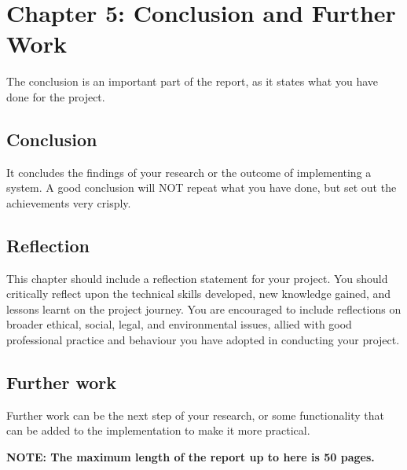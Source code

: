 \section*{Chapter 5: Conclusion and Further Work}
\setcounter{section}{5} \setcounter{subsection}{0}

The conclusion is an important part of the report, as it states what you have done for the project.

\subsection{Conclusion}
It concludes the findings of your research or the outcome of implementing a system. A good conclusion will NOT repeat what you have done, but set out the achievements very crisply.

\subsection{Reflection}
This chapter should include a reflection statement for your project. You should critically reflect upon the technical skills developed, new knowledge gained, and lessons learnt on the project journey. You are encouraged to include reflections on broader ethical, social, legal, and environmental issues, allied with good professional practice and behaviour you have adopted in conducting your project.

\subsection{Further work}
Further work can be the next step of your research, or some functionality that can be added to the implementation to make it more practical.

\vspace{\baselineskip}
\noindent\textbf{NOTE: The maximum length of the report up to here is 50 pages.}
